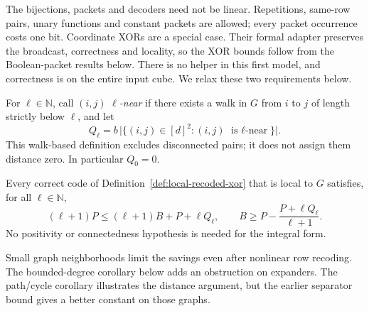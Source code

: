 The bijections, packets and decoders need not be linear. Repetitions,
same-row pairs, unary functions and constant packets are allowed; every
packet occurrence costs one bit. Coordinate XORs are a special case. Their
formal adapter preserves the broadcast, correctness and locality, so the
XOR bounds follow from the Boolean-packet results below. There is no helper
in this first model, and correctness is on the entire input cube. We relax these two
requirements below.

For $\ell\in\mathbb N$, call $(i,j)$ \emph{$\ell$-near} if there exists a
walk in $G$ from $i$ to $j$ of length strictly below $\ell$, and let
\[
  Q_\ell=b\,\bigl|\{(i,j)\in[d]^2:(i,j)\text{ is $\ell$-near}\}\bigr|.
\]
This walk-based definition excludes disconnected pairs; it does not assign
them distance zero.  In particular $Q_0=0$.

\begin{theorem}\label{thm:local-xor-distance}
Every correct code of Definition~\ref{def:local-recoded-xor} that is local to
$G$ satisfies, for all $\ell\in\mathbb N$,
\begin{equation}\label{eq:local-xor-distance}
  (\ell+1)P\le(\ell+1)B+P+\ell Q_\ell,
  \qquad
  B\ge P-\frac{P+\ell Q_\ell}{\ell+1}.
\end{equation}
No positivity or connectedness hypothesis is needed for the integral form.
\end{theorem}

Small graph neighborhoods limit the savings even after nonlinear row
recoding.  The bounded-degree corollary below adds an obstruction on
expanders.  The path/cycle corollary illustrates the distance argument, but
the earlier separator bound gives a better constant on those graphs.

